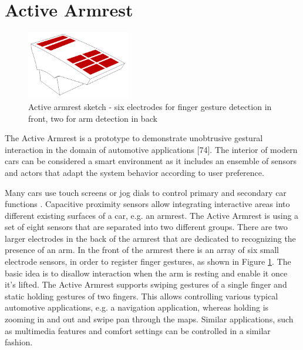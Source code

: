 \section{Active Armrest}
\begin{figure}[h]
\centering
\includegraphics[width=0.4\textwidth]{images/active_armrest}
\caption{Active armrest sketch - six electrodes for finger gesture detection in front, two for arm detection in back}
\label{fig:armrest_sketch}
\end{figure}
The Active Armrest is a prototype to demonstrate unobtrusive gestural interaction in the domain of automotive applications [74]. The interior of modern cars can be considered a smart environment as it includes an ensemble of sensors and actors that adapt the system behavior according to user preference.
 
Many cars use touch screens or jog dials to control primary and secondary car functions \cite{schmidt2010automotive}. Capacitive proximity sensors allow integrating interactive areas into different existing surfaces of a car, e.g. an armrest. The Active Armrest is using a set of eight sensors that are separated into two different groups. There are two larger electrodes in the back of the armrest that are dedicated to recognizing the presence of an arm. In the front of the armrest there is an array of six small electrode sensors, in order to register finger gestures, as shown in Figure \ref{fig:armrest_sketch}. The basic idea is to disallow interaction when the arm is resting and enable it once it's lifted. The Active Armrest supports swiping gestures of a single finger and static holding gestures of two fingers. This allows controlling various typical automotive applications, e.g. a navigation application, whereas holding is zooming in and out and swipe pan through the maps. Similar applications, such as multimedia features and comfort settings can be controlled in a similar fashion.
